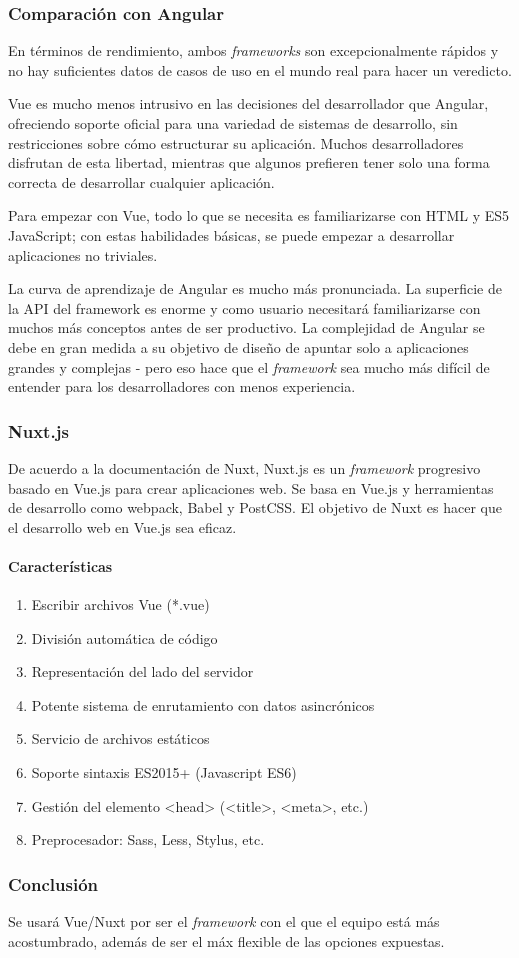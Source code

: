 \subsubsection*{Comparación con Angular}
En términos de rendimiento, ambos \textit{frameworks} son excepcionalmente rápidos y no hay suficientes datos de casos de uso en el mundo real para hacer un veredicto.


Vue es mucho menos intrusivo en las decisiones del desarrollador que Angular, ofreciendo soporte oficial para una variedad de sistemas de desarrollo, sin restricciones sobre cómo estructurar su aplicación. Muchos desarrolladores disfrutan de esta libertad, mientras que algunos prefieren tener solo una forma correcta de desarrollar cualquier aplicación.


Para empezar con Vue, todo lo que se necesita es familiarizarse con HTML y ES5 JavaScript; con estas habilidades básicas, se puede empezar a desarrollar aplicaciones no triviales.


La curva de aprendizaje de Angular es mucho más pronunciada. La superficie de la API del framework es enorme y como usuario necesitará familiarizarse con muchos más conceptos antes de ser productivo. La complejidad de Angular se debe en gran medida a su objetivo de diseño de apuntar solo a aplicaciones grandes y complejas - pero eso hace que el \textit{framework} sea mucho más difícil de entender para los desarrolladores con menos experiencia.

\subsubsection*{Nuxt.js}
De acuerdo a la documentación de Nuxt\cite{noauthor_what_nodate-1}, Nuxt.js es un \textit{framework} progresivo basado en Vue.js para crear aplicaciones web. Se basa en Vue.js y herramientas de desarrollo como webpack, Babel y PostCSS. El objetivo de Nuxt es hacer que el desarrollo web en Vue.js sea eficaz.

\paragraph*{Características}
\begin{enumerate}
    \item Escribir archivos Vue (*.vue)
    \item División automática de código
    \item Representación del lado del servidor
    \item Potente sistema de enrutamiento con datos asincrónicos
    \item Servicio de archivos estáticos
    \item Soporte sintaxis ES2015+ (Javascript ES6)
    \item Gestión del elemento <head> (<title>, <meta>, etc.)
    \item Preprocesador: Sass, Less, Stylus, etc.
\end{enumerate}


\subsubsection*{Conclusión}

Se usará Vue/Nuxt por ser el \textit{framework} con el que el equipo está más acostumbrado, además de ser el máx flexible de las opciones expuestas.